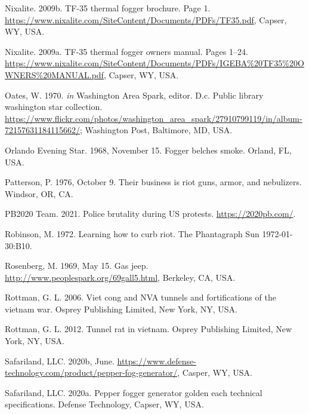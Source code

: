 \documentclass[
  11pt,
]{krantz}
\newlength{\cslhangindent}
\newlength{\cslentryspacingunit} %
\newenvironment{CSLReferences}[2] %
 {%
  \setlength{\parindent}{0pt}
  \ifodd #1
  \let\oldpar\par
  \def\par{\hangindent=\cslhangindent\oldpar}
  \fi
  \setlength{\parskip}{#2\cslentryspacingunit}
 }%
 {}
\begin{document}
\begin{CSLReferences}{1}{0}
\leavevmode{}%
Nixalite. 2009b. TF-35 thermal fogger brochure. Page 1. \url{https://www.nixalite.com/SiteContent/Documents/PDFs/TF35.pdf}, Capser, WY, USA.

\leavevmode{}%
Nixalite. 2009a. TF-35 thermal fogger owners manual. Pages 1--24. \url{https://www.nixalite.com/SiteContent/Documents/PDFs/IGEBA\%20TF35\%20OWNERS\%20MANUAL.pdf}, Capser, WY, USA.

\leavevmode{}%
Oates, W. 1970. \emph{in} Washington Area Spark, editor. D.c. Public library washington star collection. \url{https://www.flickr.com/photos/washington_area_spark/27910799119/in/album-72157631184115662/}; Washington Post, Baltimore, MD, USA.

\leavevmode{}%
Orlando Evening Star. 1968, November 15. Fogger belches smoke. Orland, FL, USA.

\leavevmode{}%
Patterson, P. 1976, October 9. Their business is riot guns, armor, and nebulizers. Windsor, OR, CA.

\leavevmode{}%
PB2020 Team. 2021. Police brutality during US protests. \url{https://2020pb.com/}.

\leavevmode{}%
Robinson, M. 1972. Learning how to curb riot. The Phantagraph Sun 1972-01-30:B10.

\leavevmode{}%
Rosenberg, M. 1969, May 15. Gas jeep. \url{http://www.peoplespark.org/69gall5.html}, Berkeley, CA, USA.

\leavevmode{}%
Rottman, G. L. 2006. Viet cong and NVA tunnels and fortifications of the vietnam war. Osprey Publishing Limited, New York, NY, USA.

\leavevmode{}%
Rottman, G. L. 2012. Tunnel rat in vietnam. Osprey Publishing Limited, New York, NY, USA.

\leavevmode{}%
Safariland, LLC. 2020b, June. \url{https://www.defense-technology.com/product/pepper-fog-generator/}, Casper, WY, USA.

\leavevmode{}%
Safariland, LLC. 2020a. Pepper fogger generator golden each technical specifications. Defense Technology, Capser, WY, USA.


\end{CSLReferences}
\end{document}
